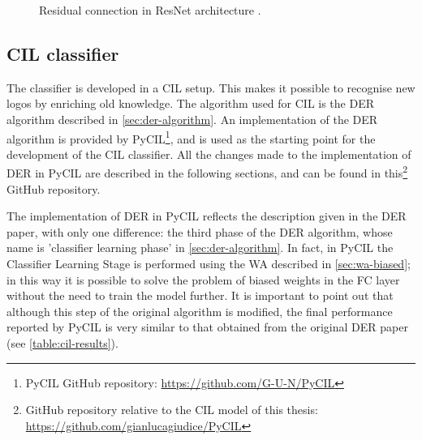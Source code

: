 \begin{figure}%
	\centering
	\hfill
	\caption{Residual connection in ResNet architecture \cite{he2016deep}.}%
	\label{fig:residual-connection}%
\end{figure}

\subsection{CIL classifier}
The classifier is developed in a CIL setup. This makes it possible to recognise new logos by enriching old knowledge. The algorithm used for CIL is the DER algorithm described in \autoref{sec:der-algorithm}. An implementation of the DER algorithm is provided by PyCIL\footnote{PyCIL GitHub repository: \href{https://github.com/G-U-N/PyCIL}{https://github.com/G-U-N/PyCIL}}, and is used as the starting point for the development of the CIL classifier. 
All the changes made to the implementation of DER in PyCIL are described in the following sections, and can be found in this\footnote{GitHub repository relative to the CIL model of this thesis: \\ \href{https://github.com/gianlucagiudice/PyCIL}{https://github.com/gianlucagiudice/PyCIL}} GitHub repository.

The implementation of DER in PyCIL reflects the description given in the DER paper, with only one difference: the third phase of the DER algorithm, whose name is 'classifier learning phase' in \autoref{sec:der-algorithm}. 
In fact, in PyCIL the Classifier Learning Stage is performed using the WA described in \autoref{sec:wa-biased}; in this way it is possible to solve the problem of biased weights in the FC layer without the need to train the model further.
It is important to point out that although this step of the original algorithm is modified, the final performance reported by PyCIL is very similar to that obtained from the original DER paper (see \autoref{table:cil-results}).


